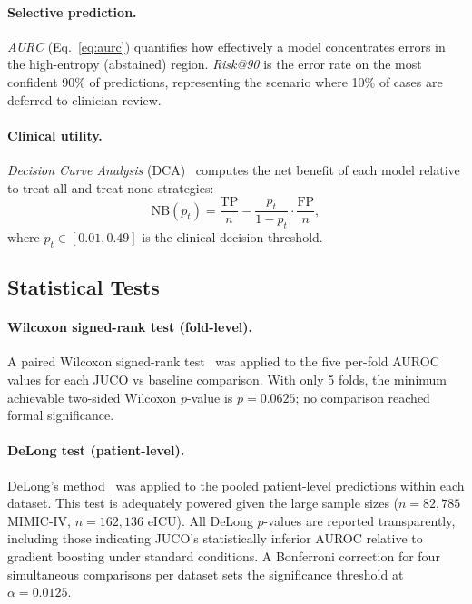 \documentclass[a4paper,fleqn,longmktitle]{cas-sc}
\begin{document}
	\paragraph{Selective prediction.}
	\emph{AURC} (Eq.~\ref{eq:aurc}) quantifies how effectively a model
	concentrates errors in the high-entropy (abstained) region.
	\emph{Risk@90} is the error rate on the most confident 90\% of
	predictions, representing the scenario where 10\% of cases are
	deferred to clinician review.
	
	\paragraph{Clinical utility.}
	\emph{Decision Curve Analysis} (DCA)~\citep{vickers2006decision}
	computes the net benefit of each model relative to treat-all and
	treat-none strategies:
	\begin{equation}
		\text{NB}(p_t) =
		\frac{\text{TP}}{n} - \frac{p_t}{1 - p_t} \cdot \frac{\text{FP}}{n},
		\label{eq:net_benefit}
	\end{equation}
	where $p_t \in [0.01, 0.49]$ is the clinical decision threshold.
	
	\subsection{Statistical Tests}
	\label{sec:statistical_tests}
	
	\paragraph{Wilcoxon signed-rank test (fold-level).}
	A paired Wilcoxon signed-rank test~\citep{wilcoxon1945individual}
	was applied to the five per-fold AUROC values for each JUCO vs
	baseline comparison.
	With only 5 folds, the minimum achievable two-sided Wilcoxon
	$p$-value is $p = 0.0625$; no comparison reached formal significance.
	
	\paragraph{DeLong test (patient-level).}
	DeLong's method~\citep{delong1988comparing} was applied to
	the pooled patient-level predictions within each dataset.
	This test is adequately powered given the large sample sizes
	($n = 82{,}785$ MIMIC-IV, $n = 162{,}136$ eICU).
	All DeLong $p$-values are reported transparently, including those
	indicating JUCO's statistically inferior AUROC relative to gradient
	boosting under standard conditions.
	A Bonferroni correction for four simultaneous comparisons per
	dataset sets the significance threshold at $\alpha = 0.0125$.
	
\end{document}

